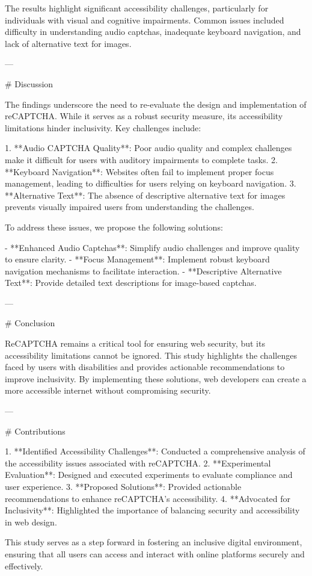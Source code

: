 The results highlight significant accessibility challenges, particularly for individuals with visual and cognitive impairments. Common issues included difficulty in understanding audio captchas, inadequate keyboard navigation, and lack of alternative text for images.

---

# Discussion

The findings underscore the need to re-evaluate the design and implementation of reCAPTCHA. While it serves as a robust security measure, its accessibility limitations hinder inclusivity. Key challenges include:

1. **Audio CAPTCHA Quality**: Poor audio quality and complex challenges make it difficult for users with auditory impairments to complete tasks.
2. **Keyboard Navigation**: Websites often fail to implement proper focus management, leading to difficulties for users relying on keyboard navigation.
3. **Alternative Text**: The absence of descriptive alternative text for images prevents visually impaired users from understanding the challenges.

To address these issues, we propose the following solutions:

- **Enhanced Audio Captchas**: Simplify audio challenges and improve quality to ensure clarity.
- **Focus Management**: Implement robust keyboard navigation mechanisms to facilitate interaction.
- **Descriptive Alternative Text**: Provide detailed text descriptions for image-based captchas.

---

# Conclusion

ReCAPTCHA remains a critical tool for ensuring web security, but its accessibility limitations cannot be ignored. This study highlights the challenges faced by users with disabilities and provides actionable recommendations to improve inclusivity. By implementing these solutions, web developers can create a more accessible internet without compromising security.

---

# Contributions

1. **Identified Accessibility Challenges**: Conducted a comprehensive analysis of the accessibility issues associated with reCAPTCHA.
2. **Experimental Evaluation**: Designed and executed experiments to evaluate compliance and user experience.
3. **Proposed Solutions**: Provided actionable recommendations to enhance reCAPTCHA's accessibility.
4. **Advocated for Inclusivity**: Highlighted the importance of balancing security and accessibility in web design.

This study serves as a step forward in fostering an inclusive digital environment, ensuring that all users can access and interact with online platforms securely and effectively.